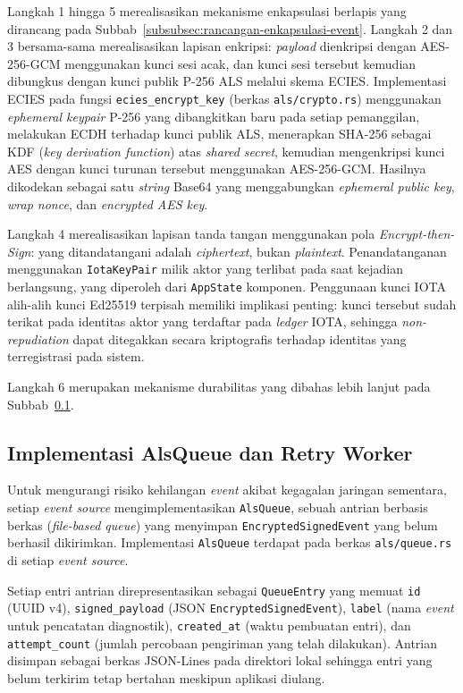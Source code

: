 Langkah 1 hingga 5 merealisasikan mekanisme enkapsulasi berlapis yang dirancang
pada Subbab~\ref{subsubsec:rancangan-enkapsulasi-event}. Langkah 2 dan 3
bersama-sama merealisasikan lapisan enkripsi: \textit{payload} dienkripsi
dengan AES-256-GCM menggunakan kunci sesi acak, dan kunci sesi tersebut
kemudian dibungkus dengan kunci publik P-256 ALS melalui skema ECIES.
Implementasi ECIES pada fungsi \texttt{ecies\_encrypt\_key} (berkas
\texttt{als/crypto.rs}) menggunakan \textit{ephemeral keypair} P-256 yang
dibangkitkan baru pada setiap pemanggilan, melakukan ECDH terhadap kunci publik
ALS, menerapkan SHA-256 sebagai KDF (\textit{key derivation function}) atas
\textit{shared secret}, kemudian mengenkripsi kunci AES dengan kunci turunan
tersebut menggunakan AES-256-GCM. Hasilnya dikodekan sebagai satu \textit{string}
Base64 yang menggabungkan \textit{ephemeral public key}, \textit{wrap nonce},
dan \textit{encrypted AES key}.

Langkah 4 merealisasikan lapisan tanda tangan menggunakan pola
\textit{Encrypt-then-Sign}: yang ditandatangani adalah \textit{ciphertext},
bukan \textit{plaintext}. Penandatanganan menggunakan \texttt{IotaKeyPair}
milik aktor yang terlibat pada saat kejadian berlangsung, yang diperoleh dari
\texttt{AppState} komponen. Penggunaan kunci IOTA alih-alih kunci Ed25519
terpisah memiliki implikasi penting: kunci tersebut sudah terikat pada identitas
aktor yang terdaftar pada \textit{ledger} IOTA, sehingga \textit{non-repudiation}
dapat ditegakkan secara kriptografis terhadap identitas yang terregistrasi pada
sistem.

Langkah 6 merupakan mekanisme durabilitas yang dibahas lebih lanjut pada
Subbab~\ref{subsec:impl-als-queue}.

\subsection{Implementasi AlsQueue dan Retry Worker}
\label{subsec:impl-als-queue}

Untuk mengurangi risiko kehilangan \textit{event} akibat kegagalan jaringan
sementara, setiap \textit{event source} mengimplementasikan \texttt{AlsQueue},
sebuah antrian berbasis berkas (\textit{file-based queue}) yang menyimpan
\texttt{EncryptedSignedEvent} yang belum berhasil dikirimkan. Implementasi
\texttt{AlsQueue} terdapat pada berkas \texttt{als/queue.rs} di setiap
\textit{event source}.

Setiap entri antrian direpresentasikan sebagai \texttt{QueueEntry} yang memuat
\texttt{id} (UUID v4), \texttt{signed\_payload} (JSON \texttt{EncryptedSignedEvent}),
\texttt{label} (nama \textit{event} untuk pencatatan diagnostik),
\texttt{created\_at} (waktu pembuatan entri), dan \texttt{attempt\_count}
(jumlah percobaan pengiriman yang telah dilakukan). Antrian disimpan sebagai
berkas JSON-Lines pada direktori lokal sehingga entri yang belum terkirim tetap
bertahan meskipun aplikasi diulang.

